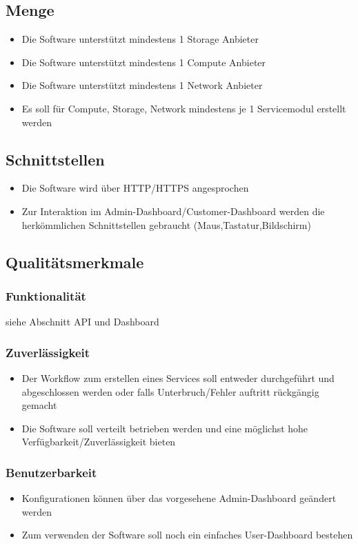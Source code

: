 \subsection{Menge}
\begin{itemize}
  \item Die Software unterstützt mindestens 1 Storage Anbieter
  \item Die Software unterstützt mindestens 1 Compute Anbieter
  \item Die Software unterstützt mindestens 1 Network Anbieter
  \item Es soll für Compute, Storage, Network mindestens je 1 Servicemodul erstellt 
  werden
\end{itemize}

\subsection{Schnittstellen}
\begin{itemize}
  \item Die Software wird über HTTP/HTTPS angesprochen
  \item Zur Interaktion im Admin-Dashboard/Customer-Dashboard werden die herkömmlichen 
  Schnittstellen gebraucht (Maus,Tastatur,Bildschirm)
\end{itemize}
\subsection{Qualitätsmerkmale}
\subsubsection{Funktionalität}
siehe Abschnitt API und Dashboard
\subsubsection{Zuverlässigkeit}
\begin{itemize}
  \item Der Workflow zum erstellen eines Services soll entweder durchgeführt und 
  abgeschlossen werden oder falls Unterbruch/Fehler auftritt rückgängig gemacht
  \item Die Software soll verteilt betrieben werden und eine möglichst hohe 
  Verfügbarkeit/Zuverlässigkeit bieten
\end{itemize}
\subsubsection{Benutzerbarkeit}
\begin{itemize}
  \item Konfigurationen können über das vorgesehene Admin-Dashboard geändert werden
  \item Zum verwenden der Software soll noch ein einfaches 
  User-Dashboard bestehen
\end{itemize}
